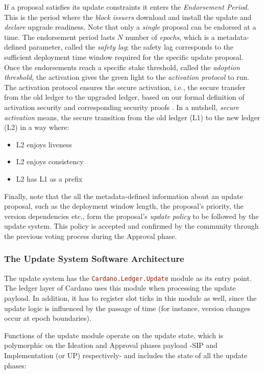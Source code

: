 If a proposal satisfies its update constraints it enters the \emph{Endorsement
	Period}. This is the period where the \emph{block issuers} download and
install the update and \emph{declare} upgrade readiness. Note that only a
\emph{single} proposal can be endorsed at a time. The endorsement period lasts
$N$ number of \emph{epochs}, which is a metadata-defined parameter, called the
\emph{safety lag}; the safety lag corresponds to the sufficient deployment time
window required for the specific update proposal. Once the endorsements reach a
specific stake threshold, called the \emph{adoption threshold}, the activation
gives the green light to the \emph{activation protocol} to run. The activation
protocol ensures the secure activation, i.e., the secure transfer from the old
ledger to the upgraded ledger, based on our formal definition of activation
security and corresponding security proofs \cite{secure_activation}. In a
nutshell, \emph{secure activation} means, the secure transition from the old
ledger (L1) to the new ledger (L2) in a way where:
\begin{itemize}
	\item L2 enjoys liveness
	\item L2 enjoys consistency
	\item L2 has L1 as a prefix
\end{itemize}

Finally, note that the
all the metadata-defined information about an update proposal, such as the
deployment window length, the proposal's priority, the version dependencies
etc., form the proposal's \emph{update policy} to be followed by the update
system. This policy is accepted and confirmed by the community through the
previous voting
process during the Approval phase.

\subsubsection{The Update System Software Architecture}

The update system has the \lstinline[language=Haskell]!Cardano.Ledger.Update! 
module as its entry
point. The ledger layer of Cardano uses this module when processing the update
payload. In addition, it has to register slot ticks in this module as well,
since the update logic is influenced by the passage of time (for instance,
version changes occur at epoch boundaries).

Functions of the update module operate on the update state, which is
polymorphic on the Ideation and Approval phases payload -SIP and 
Implementation (or UP) respectively- and includes the state of
all the update phases:


